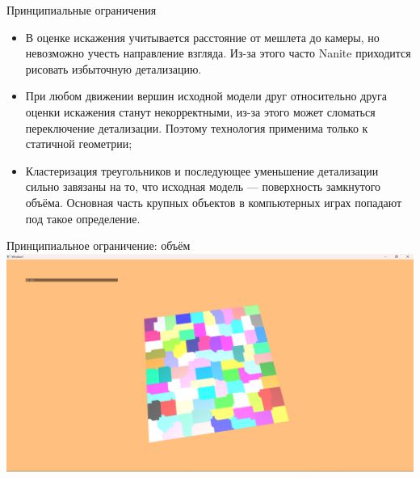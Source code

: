 \documentclass{beamer}
\begin{document}
    \begin{frame}{Принципиальные ограничения}
        \begin{itemize}
            \item В оценке искажения учитывается расстояние от мешлета до камеры, но невозможно учесть направление взгляда. Из-за этого часто Nanite приходится рисовать избыточную детализацию.
            \item При любом движении вершин исходной модели друг относительно друга оценки искажения станут некорректными, из-за этого может сломаться переключение детализации. Поэтому технология применима только к статичной геометрии;
            \item Кластеризация треугольников и последующее уменьшение детализации сильно завязаны на то, что исходная модель --- поверхность замкнутого объёма. Основная часть крупных объектов в компьютерных играх попадают под такое определение.
        \end{itemize}
    \end{frame}





    \begin{frame}{Принципиальное ограничение: объём}
        \includegraphics[width=\textwidth]{plane0.png}
    \end{frame}
\end{document}
